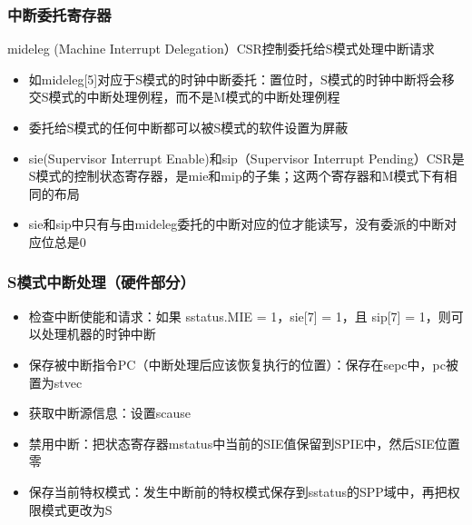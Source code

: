 \begin{frame}[fragile]
    \frametitle{中断委托寄存器}
    mideleg (Machine Interrupt Delegation）CSR控制委托给S模式处理中断请求
    \begin{itemize}
        \item 如mideleg[5]对应于S模式的时钟中断委托：置位时，S模式的时钟中断将会移交S模式的中断处理例程，而不是M模式的中断处理例程
        \item 委托给S模式的任何中断都可以被S模式的软件设置为屏蔽
        \item sie(Supervisor Interrupt Enable)和sip（Supervisor Interrupt Pending）CSR是S模式的控制状态寄存器，是mie和mip的子集；这两个寄存器和M模式下有相同的布局
        \item sie和sip中只有与由mideleg委托的中断对应的位才能读写，没有委派的中断对应位总是0
    \end{itemize}
\end{frame}

\begin{frame}[fragile]
    \frametitle{S模式中断处理（硬件部分）}
    \begin{itemize}
        \item 检查中断使能和请求：如果 sstatus.MIE = 1，sie[7] = 1，且 sip[7] = 1，则可以处理机器的时钟中断
        \item 保存被中断指令PC（中断处理后应该恢复执行的位置）：保存在sepc中，pc被置为stvec
        \item 获取中断源信息：设置scause
        \item 禁用中断：把状态寄存器mstatus中当前的SIE值保留到SPIE中，然后SIE位置零
        \item 保存当前特权模式：发生中断前的特权模式保存到sstatus的SPP域中，再把权限模式更改为S
    \end{itemize}
\end{frame}

